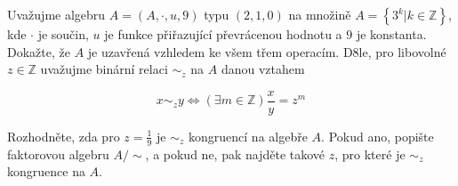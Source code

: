 Uvažujme algebru $A=(A,\cdot ,u,9)$ typu $(2,1,0)$ na množině 
$A=\left \{ 3^{k} | k\in \mathbb{Z}\right \}$, kde $\cdot$ je součin, $u$ je
funkce přiřazující převrácenou hodnotu a $9$ je konstanta. Dokažte, že $A$ je
uzavřená vzhledem ke všem třem operacím. D8le, pro libovolné $z \in \mathbb{Z}$
uvažujme binární relaci $\sim _{z}$ na $A$ danou vztahem

$$x\sim _{z}y\Leftrightarrow (\exists m \in \mathbb{Z})\frac{x}{y}=z^{m}$$

Rozhodněte, zda pro $z=\frac{1}{9}$ je $\sim _{z}$ kongruencí na algebře $A$.
Pokud ano, popište faktorovou algebru $A/\sim$, a pokud ne, pak najděte takové
$z$, pro které je $\sim _{z}$ kongruence na $A$.
